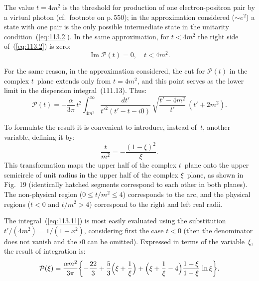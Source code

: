 The value $t = 4m^2$ is the threshold for production of one electron-positron pair by a virtual photon (cf.\ footnote on p.\,550); in the approximation considered ($\sim e^2$) a state with one pair is the only possible intermediate state in the unitarity condition~(\ref{eq:113.2}). In the same approximation, for $t < 4m^2$ the right side of~(\ref{eq:113.2}) is zero:
\begin{equation}
\operatorname{Im}\mathcal{P}(t) = 0, \quad t < 4m^2.
\label{eq:113.10}
\end{equation}

For the same reason, in the approximation considered, the cut for $\mathcal{P}(t)$ in the complex $t$~plane extends only from $t = 4m^2$, and this point serves as the lower limit in the dispersion integral~(111.13). Thus:
\begin{equation}
\mathcal{P}(t) = -\frac{\alpha}{3\pi}\,t^2 \int_{4m^2}^{\infty} \frac{dt'}{t'^2(t' - t - i0)}\,\sqrt{\frac{t' - 4m^2}{t'}}\,(t' + 2m^2).
\label{eq:113.11}
\end{equation}


To formulate the result it is convenient to introduce, instead of~$t$, another variable, defining it by:
\begin{equation}
\frac{t}{m^2} = -\frac{(1 - \xi)^2}{\xi}.
\label{eq:113.12}
\end{equation}
This transformation maps the upper half of the complex $t$~plane onto the upper semicircle of unit radius in the upper half of the complex $\xi$~plane, as shown in Fig.~19 (identically hatched segments correspond to each other in both planes). The non-physical region ($0 \leq t/m^2 \leq 4$) corresponds to the arc, and the physical regions ($t < 0$ and $t/m^2 > 4$) correspond to the right and left real radii.


The integral~(\ref{eq:113.11}) is most easily evaluated using the substitution $t'/(4m^2) = 1/(1 - x^2)$, considering first the case $t < 0$ (then the denominator does not vanish and the $i0$ can be omitted). Expressed in terms of the variable~$\xi$, the result of integration is:
\begin{equation}
\mathcal{P}(\xi) = \frac{\alpha m^2}{3\pi}\biggl\{-\frac{22}{3} + \frac{5}{3}\Bigl(\xi + \frac{1}{\xi}\Bigr) + \Bigl(\xi + \frac{1}{\xi} - 4\Bigr)\frac{1 + \xi}{1 - \xi}\,\ln\xi\biggr\}.
\label{eq:113.13}
\end{equation}

